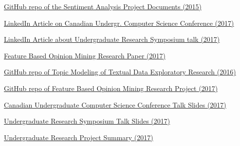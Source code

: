 \documentclass[12pt]{article} %
\begin{document}
\begin{thebibliography}{99} %

\href{https://github.com/norberte/DataCollector/tree/master/docs}{GitHub repo of the Sentiment Analysis Project Documents (2015)} 

\href{https://www.linkedin.com/pulse/my-first-research-talk-conference-norbert-eke/}{LinkedIn Article on Canadian Undergr. Computer Science Conference (2017)} 

\href{https://www.linkedin.com/pulse/feature-based-customer-opinion-mining-research-project-norbert-eke/}{LinkedIn Article about Undergraduate Research Symposium talk (2017)} 

\href{https://github.com/norberte/Latex-Research-Paper/blob/master/Research\%20Paper.pdf}{Feature Based Opinion Mining Research Paper (2017)} 

\href{https://github.com/norberte/DeepNLP-TopicModelling}{GitHub repo of Topic Modeling  of Textual Data Exploratory Research (2016)} 

\href{https://github.com/norberte/Feature-Based-Opinion-Mining}{GitHub repo of Feature Based Opinion Mining Research Project (2017)} 

\href{https://github.com/norberte/Feature-Based-Opinion-Mining/blob/master/CUCSC\%202017\%20presentation.pdf}{Canadian Undergraduate Computer Science Conference Talk Slides (2017)} 

\href{https://github.com/norberte/Feature-Based-Opinion-Mining/blob/master/URA\%20Presentation\%202017.pdf}{Undergraduate Research Symposium Talk Slides (2017)}

\href{https://github.com/norberte/Feature-Based-Opinion-Mining/blob/master/URA\%20Research\%20Summary.pdf}{Undergraduate Research Project Summary (2017)} 

 
\end{thebibliography}

\end{document}
